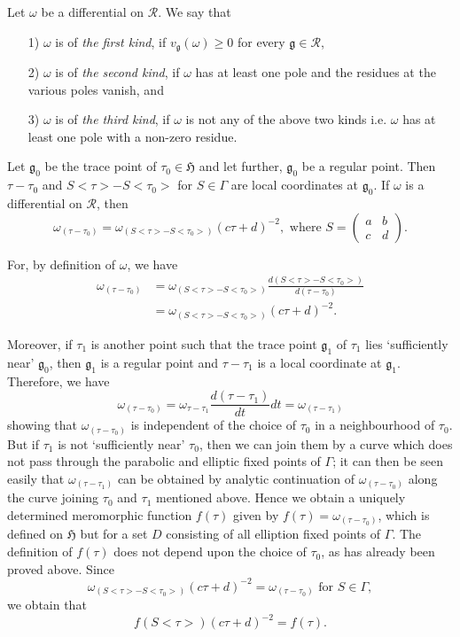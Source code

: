 Let $\omega$ be a differential on $\mathscr{R}$. We say that 
\begin{itemize}
\item[1)] $\omega$ is of \textit{the first kind}, if
  $v_{\mathfrak{g}}(\omega)\geq 0$ for every $\mathfrak{g}\in
  \mathscr{R}$, 

\item[2)] $\omega$ is of \textit{the second kind}, if $\omega$ has at
  least one pole and the residues at the various poles vanish, and 

\item[3)] $\omega$ is of \textit{the third kind}, if $\omega$ is not
  any of the above two kinds i.e. $\omega$ has at least one pole with
  a non-zero residue.
\end{itemize}

Let $\mathfrak{g}_0$ be the trace point of $\tau_0\in
\mathfrak{H}$ and let further, $\mathfrak{g}_0$ be a regular
point. Then $\tau-\tau_0$ and $S<\tau>-S<\tau_0>$ for $S\in
\Gamma$ are local coordinates at $\mathfrak{g}_0$. If $\omega$ is a
differential on $\mathscr{R}$, then 
$$
\omega_{(\tau-\tau_0)} = \omega_{(S<\tau>-S<\tau_0>)} (c\tau + d)^{-2},
\text{ where } S = \left(\begin{smallmatrix}
a&b\\c&d\end{smallmatrix} \right).
$$

For, by definition of $\omega$, we have 
\begin{align*}
\omega_{(\tau-\tau_0)} & = \omega_{(S<\tau>-S<\tau_0>)}
\frac{d(S<\tau>-S<\tau_0>)}{d(\tau -\tau_0)}\\
& = \omega_{(S<\tau>-S<\tau_0>)} (c\tau + d)^{-2}.
\end{align*}

Moreover, if $\tau_1$ is another point such that the trace point
$\mathfrak{g}_1$ of $\tau_1$ lies `sufficiently near'
$\mathfrak{g}_0$, then $\mathfrak{g}_1$ is a regular point and
$\tau-\tau_1$ is a local \pageoriginale coordinate at
$\mathfrak{g}_1$. Therefore, we have 
$$
\omega_{(\tau-\tau_0)} = \omega_{\tau-\tau_1} \frac{d(\tau-\tau_1)}{dt}
dt = \omega_{(\tau-\tau_1)}
$$
showing that $\omega_{(\tau-\tau_0)}$ is independent of the choice of
$\tau_0$ in a neighbourhood of $\tau_0$. But if $\tau_1$ is not
`sufficiently near' $\tau_0$, then we can join them by a curve which
does not pass through the parabolic and elliptic fixed points of
$\Gamma$; it can then be seen easily that $\omega_{(\tau-\tau_1)}$ can
be obtained by analytic continuation of $\omega_{(\tau-\tau_0)}$ along
the curve joining $\tau_0$ and $\tau_1$ mentioned above. Hence we
obtain a uniquely determined meromorphic function $f(\tau)$ given by
$f(\tau)=\omega_{(\tau-\tau_0)}$, which is defined on $\mathfrak{H}$
but for a set $D$ consisting of all elliption fixed points of
$\Gamma$. The definition of $f(\tau)$ does not depend upon the choice
of $\tau_0$, as has already been proved above. Since
$$
\omega_{(S<\tau>-S<\tau_0>)} (c\tau+d)^{-2} = \omega_{(\tau-\tau_0)}
\text{ for } S \in \Gamma,
$$
we obtain that 
\begin{equation*}
f(S<\tau>) (c\tau +d)^{-2} = f(\tau). \tag{1}\label{eq5:1}
\end{equation*}

